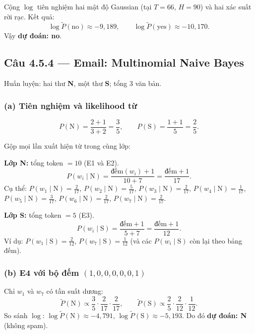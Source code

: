 Cộng \(\log\) tiên nghiệm hai mật độ Gaussian (tại \(T=66\), \(H=90\)) và hai xác suất rời rạc. Kết quả:
\[
\log\tilde P(\text{no})\approx -9{,}189,\qquad
\log\tilde P(\text{yes})\approx -10{,}170.
\]
Vậy \textbf{dự đoán: no}.

\subsection*{Câu 4.5.4 --- Email: Multinomial Naive Bayes}

Huấn luyện: hai thư \textbf{N}, một thư \textbf{S}; tổng \(3\) văn bản.

\subsubsection*{(a) Tiên nghiệm và likelihood từ}

\[
P(\text{N})=\frac{2+1}{3+2}=\frac{3}{5},\qquad
P(\text{S})=\frac{1+1}{5}=\frac{2}{5}.
\]

Gộp mọi lần xuất hiện từ trong cùng lớp:

\medskip
\noindent\textbf{Lớp N:} tổng token \(=10\) (E1 và E2).
\[
P(w_i\mid \text{N})=\frac{\text{đếm}(w_i)+1}{10+7}=\frac{\text{đếm}+1}{17}.
\]
Cụ thể: \(P(w_1\mid \text{N})=\frac{2}{17}\), \(P(w_2\mid \text{N})=\frac{5}{17}\), \(P(w_3\mid \text{N})=\frac{2}{17}\), \(P(w_4\mid \text{N})=\frac{1}{17}\), \(P(w_5\mid \text{N})=\frac{3}{17}\), \(P(w_6\mid \text{N})=\frac{2}{17}\), \(P(w_7\mid \text{N})=\frac{2}{17}\).

\noindent\textbf{Lớp S:} tổng token \(=5\) (E3).
\[
P(w_i\mid \text{S})=\frac{\text{đếm}+1}{5+7}=\frac{\text{đếm}+1}{12}.
\]
Ví dụ: \(P(w_1\mid \text{S})=\frac{2}{12}\), \(P(w_7\mid \text{S})=\frac{1}{12}\) (và các \(P(w_i\mid\text{S})\) còn lại theo bảng đếm).

\subsubsection*{(b) E4 với bộ đếm \((1,0,0,0,0,0,1)\)}

Chỉ \(w_1\) và \(w_7\) có tần suất dương:
\[
\tilde P(\text{N})\propto \frac{3}{5}\cdot\frac{2}{17}\cdot\frac{2}{17},\qquad
\tilde P(\text{S})\propto \frac{2}{5}\cdot\frac{2}{12}\cdot\frac{1}{12}.
\]
So sánh \(\log\): \(\log\tilde P(\text{N})\approx -4{,}791\), \(\log\tilde P(\text{S})\approx -5{,}193\). Do đó \textbf{dự đoán: N} (không spam).
